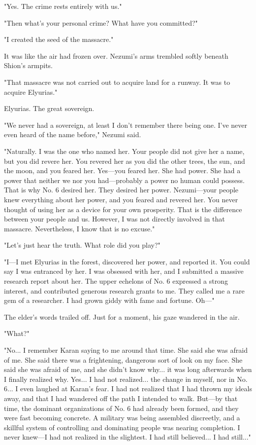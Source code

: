 "Yes. The crime rests entirely with us."

"Then what's your personal crime? What have you committed?"

"I created the seed of the massacre."

It was like the air had frozen over. Nezumi's arms trembled softly
beneath Shion's armpits.

"That massacre was not carried out to acquire land for a runway. It was
to acquire Elyurias."

Elyurias. The great sovereign.

\mybreak

"We never had a sovereign, at least I don't remember there being one.
I've never even heard of the name before," Nezumi said.

"Naturally. I was the one who named her. Your people did not give her a
name, but you did revere her. You revered her as you did the other
trees, the sun, and the moon, and you feared her. Yes---you feared her.
She had power. She had a power that neither we nor you had---probably a
power no human could possess. That is why No. 6 desired her. They
desired her power. Nezumi---your people knew everything about her power,
and you feared and revered her. You never thought of using her as a
device for your own prosperity. That is the difference between your
people and us. However, I was not directly involved in that massacre.
Nevertheless, I know that is no excuse."

"Let's just hear the truth. What role did you play?"

"I---I met Elyurias in the forest, discovered her power, and reported it.
You could say I was entranced by her. I was obsessed with her, and I
submitted a massive research report about her. The upper echelons of No.
6 expressed a strong interest, and contributed generous research grants
to me. They called me a rare gem of a researcher. I had grown giddy with
fame and fortune. Oh---"

The elder's words trailed off. Just for a moment, his gaze wandered in
the air.

"What?"

"No... I remember Karan saying to me around that time. She said she was
afraid of me. She said there was a frightening, dangerous sort of look
on my face. She said she was afraid of me, and she didn't know why... it
was long afterwards when I finally realized why. Yes... I had not
realized... the change in myself, nor in No. 6... I even laughed at
Karan's fear. I had not realized that I had thrown my ideals away, and
that I had wandered off the path I intended to walk. But---by that time,
the dominant organizations of No. 6 had already been formed, and they
were fast becoming concrete. A military was being assembled discreetly,
and a skillful system of controlling and dominating people was nearing
completion. I never knew---I had not realized in the slightest. I had
still believed... I had still..."

